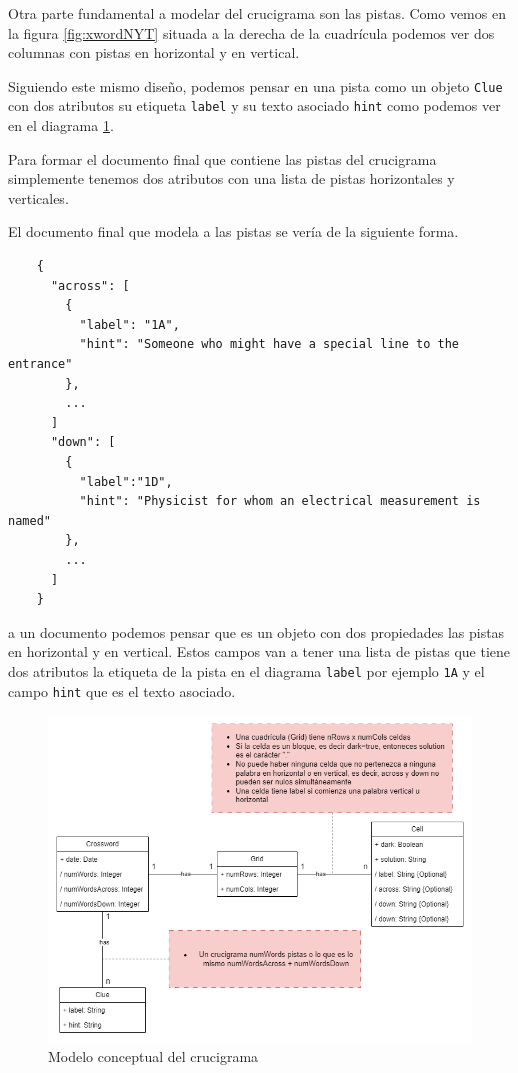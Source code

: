 \documentclass[12pt, a4paper]{article}
\begin{document}
Otra parte fundamental a modelar del crucigrama son las pistas. Como vemos
en la figura \ref{fig:xwordNYT} situada a la derecha de la cuadrícula podemos
ver dos columnas con pistas en horizontal y en vertical.

Siguiendo este mismo diseño, podemos pensar en una pista como un objeto \verb*|Clue|
con dos atributos su etiqueta \verb*|label| y su texto asociado \verb*|hint|
como podemos ver en el diagrama \ref{fig:datamodel}.

Para formar el documento final que contiene las pistas del crucigrama simplemente
tenemos dos atributos con una lista de pistas horizontales y verticales.

El documento final que modela a las pistas se vería de la siguiente forma.

\begin{verbatim}
	{
	  "across": [
	    {
	      "label": "1A",
	      "hint": "Someone who might have a special line to the entrance"
	    },
	    ...
	  ]
	  "down": [
	    {
	      "label":"1D",
	      "hint": "Physicist for whom an electrical measurement is named"
	    },
	    ...
	  ]
	}
\end{verbatim}


a un documento podemos pensar que es un objeto con dos propiedades las pistas
en horizontal y en vertical. Estos campos van a tener una lista de pistas que
tiene dos atributos la etiqueta de la pista en el diagrama \verb*|label|
por ejemplo \verb*|1A| y el campo \verb*|hint| que es el texto asociado.

\begin{figure}[p]
	\centering
	\label{fig:datamodel}
	\includegraphics[width=0.8\linewidth]{img/datamodel.png}
	\caption{Modelo conceptual del crucigrama}
\end{figure}
\end{document}
